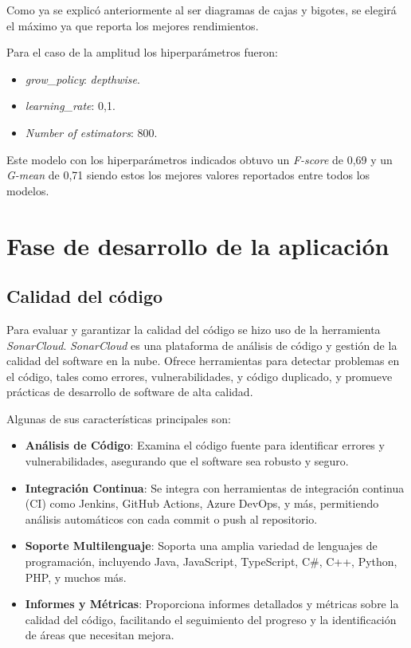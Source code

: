 Como ya se explicó anteriormente al ser diagramas de cajas y bigotes, se elegirá el máximo ya que reporta los mejores rendimientos.

Para el caso de la amplitud los hiperparámetros fueron:
\begin{itemize}
\item \textit{grow\_policy}: \textit{depthwise}.
\item \textit{learning\_rate}: 0,1.
\item \textit{Number of estimators}: 800.
\end{itemize}
Este modelo con los hiperparámetros indicados obtuvo un \textit{F-score} de 0,69 y un \textit{G-mean} de 0,71 siendo estos los mejores valores reportados entre todos los modelos.

\section{Fase de desarrollo de la aplicación}
\label{Fase de desarrollo de la aplicación}
\subsection{Calidad del código}
Para evaluar y garantizar la calidad del código se hizo uso de la herramienta \textit{SonarCloud}. \textit{SonarCloud} es una plataforma de análisis de código y gestión de la calidad del software en la nube. Ofrece herramientas para detectar problemas en el código, tales como errores, vulnerabilidades, y código duplicado, y promueve prácticas de desarrollo de software de alta calidad.

Algunas de sus características principales son:
\begin{itemize}

\item \textbf{Análisis de Código}: Examina el código fuente para identificar errores y vulnerabilidades, asegurando que el software sea robusto y seguro.

\item \textbf{Integración Continua}: Se integra con herramientas de integración continua (CI) como Jenkins, GitHub Actions, Azure DevOps, y más, permitiendo análisis automáticos con cada commit o push al repositorio.

\item \textbf{Soporte Multilenguaje}: Soporta una amplia variedad de lenguajes de programación, incluyendo Java, JavaScript, TypeScript, C\#, C++, Python, PHP, y muchos más.

\item \textbf{Informes y Métricas}: Proporciona informes detallados y métricas sobre la calidad del código, facilitando el seguimiento del progreso y la identificación de áreas que necesitan mejora.
\end{itemize}

